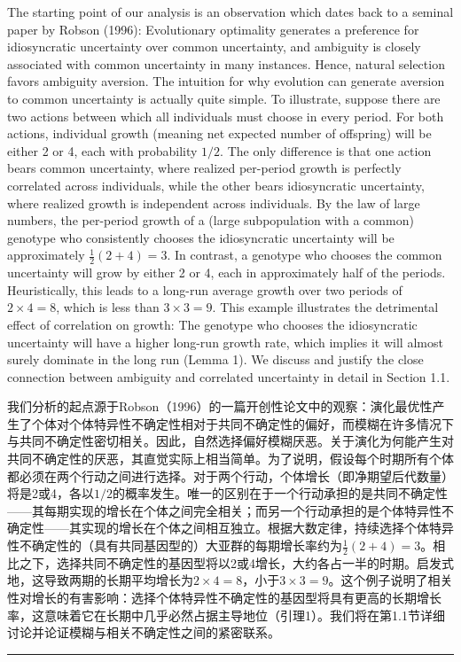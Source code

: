 \documentclass[12pt,a4paper]{article}
\newenvironment{original}
  {\par\noindent\color{black}\smallskip}
  {\par\smallskip}
\newenvironment{translation}
  {\par\noindent\color{blue!70!black}\smallskip}
  {\par\medskip\hrule\medskip}
\begin{document}
\begin{original}
The starting point of our analysis is an observation which dates back to a seminal paper by Robson (1996): Evolutionary optimality generates a preference for idiosyncratic uncertainty over common uncertainty, and ambiguity is closely associated with common uncertainty in many instances. Hence, natural selection favors ambiguity aversion. The intuition for why evolution can generate aversion to common uncertainty is actually quite simple. To illustrate, suppose there are two actions between which all individuals must choose in every period. For both actions, individual growth (meaning net expected number of offspring) will be either 2 or 4, each with probability $1/2$. The only difference is that one action bears common uncertainty, where realized per-period growth is perfectly correlated across individuals, while the other bears idiosyncratic uncertainty, where realized growth is independent across individuals. By the law of large numbers, the per-period growth of a (large subpopulation with a common) genotype who consistently chooses the idiosyncratic uncertainty will be approximately $\frac{1}{2}(2+4) = 3$. In contrast, a genotype who chooses the common uncertainty will grow by either 2 or 4, each in approximately half of the periods. Heuristically, this leads to a long-run average growth over two periods of $2 \times 4 = 8$, which is less than $3 \times 3 = 9$. This example illustrates the detrimental effect of correlation on growth: The genotype who chooses the idiosyncratic uncertainty will have a higher long-run growth rate, which implies it will almost surely dominate in the long run (Lemma 1). We discuss and justify the close connection between ambiguity and correlated uncertainty in detail in Section 1.1.
\end{original}
\begin{translation}
我们分析的起点源于Robson（1996）的一篇开创性论文中的观察：演化最优性产生了个体对个体特异性不确定性相对于共同不确定性的偏好，而模糊在许多情况下与共同不确定性密切相关。因此，自然选择偏好模糊厌恶。关于演化为何能产生对共同不确定性的厌恶，其直觉实际上相当简单。为了说明，假设每个时期所有个体都必须在两个行动之间进行选择。对于两个行动，个体增长（即净期望后代数量）将是2或4，各以$1/2$的概率发生。唯一的区别在于一个行动承担的是共同不确定性——其每期实现的增长在个体之间完全相关；而另一个行动承担的是个体特异性不确定性——其实现的增长在个体之间相互独立。根据大数定律，持续选择个体特异性不确定性的（具有共同基因型的）大亚群的每期增长率约为$\frac{1}{2}(2+4) = 3$。相比之下，选择共同不确定性的基因型将以2或4增长，大约各占一半的时期。启发式地，这导致两期的长期平均增长为$2 \times 4 = 8$，小于$3 \times 3 = 9$。这个例子说明了相关性对增长的有害影响：选择个体特异性不确定性的基因型将具有更高的长期增长率，这意味着它在长期中几乎必然占据主导地位（引理1）。我们将在第1.1节详细讨论并论证模糊与相关不确定性之间的紧密联系。
\end{translation}
\end{document}
